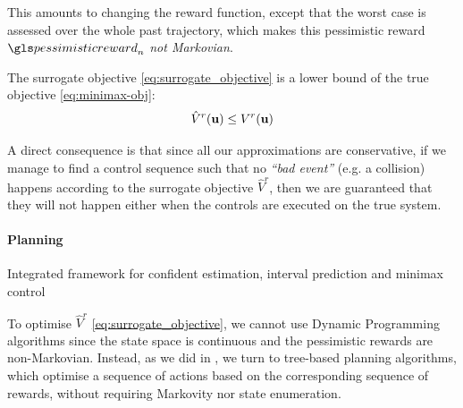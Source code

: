 This amounts to changing the reward function, except that the worst case is assessed over the whole past trajectory, which makes this pessimistic reward $\pessimisticreward_n$ \emph{not Markovian}.

\begin{proposition}
	\label{prop:lower-bound}
	\begin{leftbar}[propositionbar]
	The surrogate objective  \eqref{eq:surrogate_objective} is a lower bound of the true objective  \eqref{eq:minimax-obj}: 
	\begin{equation*}
	\hat{V}^r(\mathbf{u}) \leq V^r(\mathbf{u})
	\end{equation*}
	\end{leftbar}
\end{proposition}
A direct consequence is that since all our approximations are conservative, if we manage to find a control sequence such that no \textit{``bad event''} (e.g. a collision) happens according to the surrogate objective $\hat{V}^r$, then we are guaranteed that they will not happen either when the controls are executed on the true system. 

\paragraph{Planning}

\begin{algorithm}[t]
	\DontPrintSemicolon
	\caption{Integrated framework for confident estimation, interval prediction and minimax control}
	\label{alg:full}
	
	
\end{algorithm}

To optimise $\hat{V}^r$ \eqref{eq:surrogate_objective}, we cannot use Dynamic Programming algorithms since the state space is continuous and the pessimistic rewards are non-Markovian. Instead, as we did in , we turn to tree-based planning algorithms, which optimise a sequence of actions based on the corresponding sequence of rewards, without requiring Markovity nor state enumeration.

